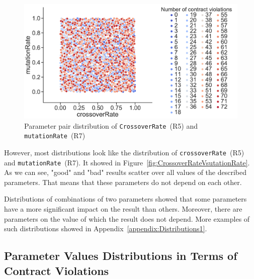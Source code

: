 \begin{figure}
	\centering
	\includegraphics[width=\textwidth]{images/CrossoverRateVsutationRate.pdf}
	\caption[Parameter pair distribution of \texttt{CrossoverRate}~(R5) and \texttt{mutationRate}~(R7)]{Parameter pair distribution of \texttt{CrossoverRate}~(R5) and \texttt{mutationRate}~(R7)}
	\label{fig:CrossoverRateVmutationRate}
\end{figure}

However, most distributions look like the distribution of \texttt{crossoverRate}~(R5) and \texttt{mutationRate}~(R7). It showed in Figure~\ref{fig:CrossoverRateVsutationRate}. As we can see, "good" and "bad" results scatter over all values of the described parameters. That means that these parameters do not depend on each other.

Distributions of combinations of two parameters showed that some parameters have a more significant impact on the result than others. Moreover, there are parameters on the value of which the result does not depend. More examples of such distributions showed in Appendix~\ref{appendix:Distributions1}.

\subsection{Parameter Values Distributions in Terms of Contract Violations}

